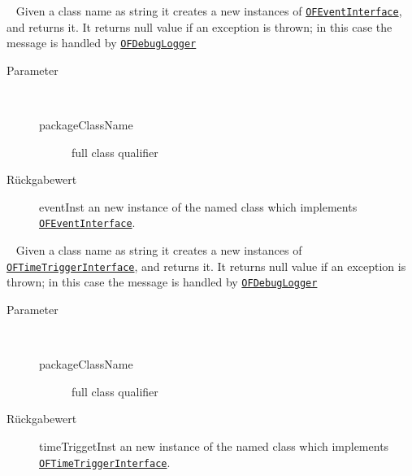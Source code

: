 \begin{description}
~ Given a class name as string it creates a new instances of \texttt{\hyperlink{ontologyFramework.OFEventManagement.OFLogicalEventManagement.OFEventInterface-class}{OFEventInterface}},
 and returns it. It returns null value if an exception is thrown; in this case the message is 
 handled by \texttt{\hyperlink{ontologyFramework.OFErrorManagement.OFDebugLogger-class}{OFDebugLogger}}
\begin{description}
\item[Parameter] ~
\begin{description}
\item[packageClassName]
full class qualifier
\end{description}
\item[Rückgabewert] 
eventInst an new instance of the named class which implements \texttt{\hyperlink{ontologyFramework.OFEventManagement.OFLogicalEventManagement.OFEventInterface-class}{OFEventInterface}}.
\end{description}
\item[{\ltdHypertarget{ontologyFramework.OFRunning.OFInvokingManager.ReflactionInstanciater.instanciateOFTimeTriggrtByName(java.lang.String)}{instanciateOFTimeTriggrtByName}\label{ontologyFramework.OFRunning.OFInvokingManager.ReflactionInstanciater.instanciateOFTimeTriggrtByName(java.lang.String)}}]
~ Given a class name as string it creates a new instances of \texttt{\hyperlink{ontologyFramework.OFEventManagement.OFTimeTriggerManagement.OFTimeTriggerInterface-class}{OFTimeTriggerInterface}},
 and returns it. It returns null value if an exception is thrown; in this case the message is 
 handled by \texttt{\hyperlink{ontologyFramework.OFErrorManagement.OFDebugLogger-class}{OFDebugLogger}}
\begin{description}
\item[Parameter] ~
\begin{description}
\item[packageClassName]
full class qualifier
\end{description}
\item[Rückgabewert] 
timeTriggetInst an new instance of the named class which implements \texttt{\hyperlink{ontologyFramework.OFEventManagement.OFTimeTriggerManagement.OFTimeTriggerInterface-class}{OFTimeTriggerInterface}}.
\end{description}
\end{description}
